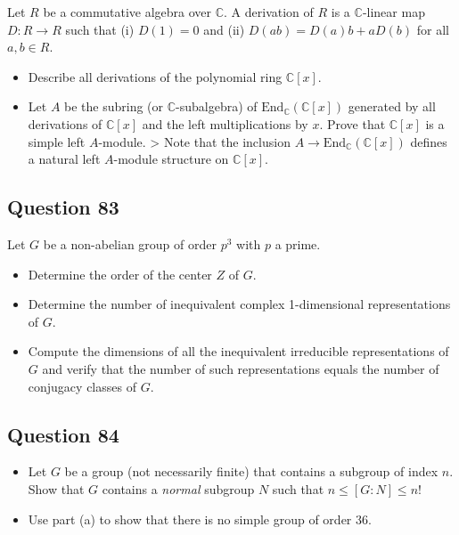 \documentclass[12pt]{article}
\begin{document}
Let \(R\) be a commutative algebra over \(\mathbb C\). A derivation of
\(R\) is a \(\mathbb C\)-linear map \(D:R\rightarrow R\) such that (i)
\(D(1)=0\) and (ii) \(D(ab)=D(a)b+aD(b)\) for all \(a,b\in R\).

\begin{itemize}
\item
  Describe all derivations of the polynomial ring \(\mathbb C[x]\).
\item
  Let \(A\) be the subring (or \(\mathbb C\)-subalgebra) of
  \(\mathrm{End}_{\mathbb C}(\mathbb C[x])\) generated by all
  derivations of \(\mathbb C[x]\) and the left multiplications by \(x\).
  Prove that \(\mathbb C[x]\) is a simple left \(A\)-module.
  \textgreater{} Note that the inclusion
  \(A\rightarrow\mathrm{End}_{\mathbb C}(\mathbb C[x])\) defines a
  natural left \(A\)-module structure on \(\mathbb C[x]\).
\end{itemize}

\hypertarget{question-83}{%
\subsection{Question 83}\label{question-83}}

Let \(G\) be a non-abelian group of order \(p^3\) with \(p\) a prime.

\begin{itemize}
\item
  Determine the order of the center \(Z\) of \(G\).
\item
  Determine the number of inequivalent complex 1-dimensional
  representations of \(G\).
\item
  Compute the dimensions of all the inequivalent irreducible
  representations of \(G\) and verify that the number of such
  representations equals the number of conjugacy classes of \(G\).
\end{itemize}

\hypertarget{question-84}{%
\subsection{Question 84}\label{question-84}}

\begin{itemize}
\item
  Let \(G\) be a group (not necessarily finite) that contains a subgroup
  of index \(n\). Show that \(G\) contains a \textit{normal} subgroup
  \(N\) such that \(n\leq[G:N]\leq n!\)
\item
  Use part (a) to show that there is no simple group of order 36.
\end{itemize}
\end{document}
